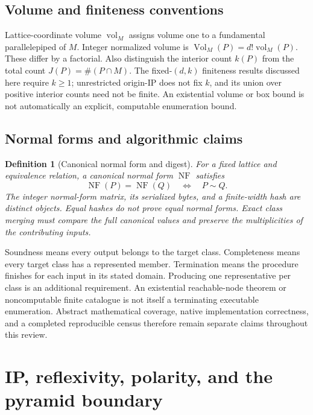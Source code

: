 \documentclass[11pt,a4paper,oneside]{report}
\newtheorem{definition}{Definition}[chapter]
\begin{document}
\section{Volume and finiteness conventions}

Lattice-coordinate volume \(\operatorname{vol}_{M}\) assigns volume one
to a fundamental parallelepiped of \(M\). Integer normalized volume is
\(\operatorname{Vol}_{M}(P)=d!\operatorname{vol}_{M}(P)\).
These differ by a factorial. Also distinguish the interior count
\(k(P)\) from the total count \(J(P)=\#(P\cap M)\).
The fixed-\((d,k)\) finiteness results discussed here require \(k\geq1\);
unrestricted origin-IP does not fix \(k\), and its union over positive
interior counts need not be finite. An existential volume or box bound
is not automatically an explicit, computable enumeration bound.

\section{Normal forms and algorithmic claims}

\begin{definition}[Canonical normal form and digest]
For a fixed lattice and equivalence relation, a canonical normal form
\(\operatorname{NF}\) satisfies
\[
  \operatorname{NF}(P)=\operatorname{NF}(Q)
   \quad\Longleftrightarrow\quad P\sim Q.
\]
The integer normal-form matrix, its serialized bytes, and a finite-width
hash are distinct objects. Equal hashes do not prove equal normal forms.
Exact class merging must compare the full canonical values and preserve
the multiplicities of the contributing inputs.
\end{definition}

Soundness means every output belongs to the target class. Completeness
means every target class has a represented member. Termination means the
procedure finishes for each input in its stated domain. Producing one
representative per class is an additional requirement. An existential
reachable-node theorem or noncomputable finite catalogue is not itself
a terminating executable enumeration. Abstract mathematical coverage,
native implementation correctness, and a completed reproducible census
therefore remain separate claims throughout this review.

\chapter{IP, reflexivity, polarity, and the pyramid
boundary}\label{ip-reflexivity-and-pyramids--ip-reflexivity-polarity-and-the-pyramid-boundary}
\end{document}

